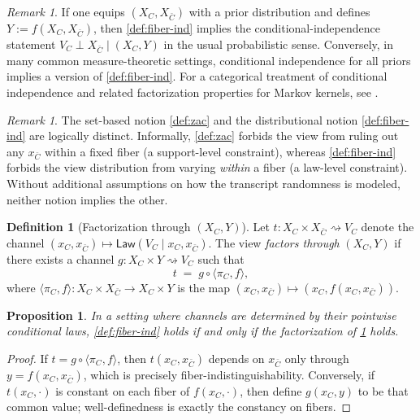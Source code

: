 \documentclass[11pt,a4paper]{article}
\newtheorem{proposition}[theorem]{Proposition}
\theoremstyle{definition}
\newtheorem{definition}[theorem]{Definition}
\theoremstyle{remark}
\newtheorem{remark}[theorem]{Remark}
\begin{document}
\begin{remark}
\label{rem:cond-indep}
If one equips $(X_C,X_{\bar C})$ with a prior distribution and defines $Y:=f(X_C,X_{\bar C})$, then \cref{def:fiber-ind} implies the conditional-independence statement
$
V_C \perp X_{\bar C}\mid (X_C,Y)
$
in the usual probabilistic sense. Conversely, in many common measure-theoretic settings, conditional independence for all priors implies a version of \cref{def:fiber-ind}.
For a categorical treatment of conditional independence and related factorization properties for Markov kernels, see \cite{Fritz2020}.
\end{remark}

\begin{remark}
\label{rem:zac-vs-fiber-ind}
The set-based notion \cref{def:zac} and the distributional notion \cref{def:fiber-ind} are logically distinct.
Informally, \cref{def:zac} forbids the view from ruling out any $x_{\bar C}$ within a fixed fiber (a support-level constraint), whereas \cref{def:fiber-ind} forbids the view distribution from varying \emph{within} a fiber (a law-level constraint). Without additional assumptions on how the transcript randomness is modeled, neither notion implies the other.
\end{remark}

\begin{definition}[Factorization through $(X_C,Y)$]
\label{def:factorization}
Let $t : X_C\times X_{\bar C} \rightsquigarrow V_C$ denote the channel $(x_C,x_{\bar C})\mapsto \mathsf{Law}(V_C\mid x_C,x_{\bar C})$.
The view \emph{factors through} $(X_C,Y)$ if there exists a channel $g : X_C\times Y \rightsquigarrow V_C$ such that
\[
t \;=\; g \circ \langle \pi_C, f\rangle,
\]
where $\langle \pi_C,f\rangle : X_C\times X_{\bar C}\to X_C\times Y$ is the map $(x_C,x_{\bar C})\mapsto (x_C,f(x_C,x_{\bar C}))$.
\end{definition}

\begin{proposition}
\label{prop:fiber-ind-iff-factor}
In a setting where channels are determined by their pointwise conditional laws, \cref{def:fiber-ind} holds if and only if the factorization of \cref{def:factorization} holds.
\end{proposition}

\begin{proof}
If $t=g\circ\langle \pi_C,f\rangle$, then $t(x_C,x_{\bar C})$ depends on $x_{\bar C}$ only through $y=f(x_C,x_{\bar C})$, which is precisely fiber-indistinguishability. Conversely, if $t(x_C,\cdot)$ is constant on each fiber of $f(x_C,\cdot)$, then define $g(x_C,y)$ to be that common value; well-definedness is exactly the constancy on fibers.
\end{proof}
\end{document}
